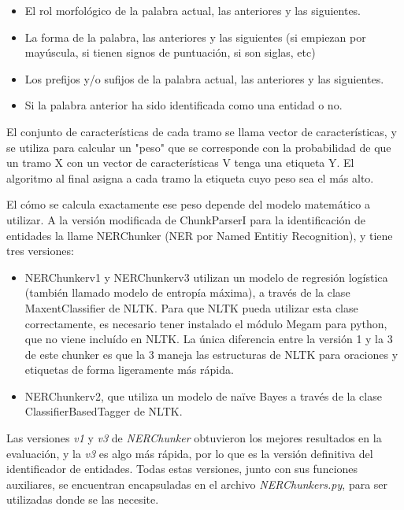 \documentclass{pre-tfg}
\begin{document}
\begin{itemize}
	\item El rol morfológico de la palabra actual, las anteriores y las siguientes.
	\item La forma de la palabra, las anteriores y las siguientes (si empiezan por mayúscula, si tienen signos de puntuación, si son siglas, etc)
	\item Los prefijos y/o sufijos de la palabra actual, las anteriores  y las siguientes.
	\item Si la palabra anterior ha sido identificada como una entidad o no.
	
\end{itemize}

El conjunto de características de cada tramo se llama vector de características, y se utiliza para calcular un "peso" que se corresponde con la probabilidad de que un tramo X con un vector de características V tenga una etiqueta Y. El algoritmo al final asigna a cada tramo la etiqueta cuyo peso sea el más alto.

El cómo se calcula exactamente ese peso depende del modelo matemático a utilizar. A la versión modificada de ChunkParserI para la identificación de entidades la llame NERChunker (NER por Named Entitiy Recognition), y tiene tres versiones:

\begin{itemize}
	\item NERChunkerv1 y NERChunkerv3 utilizan un modelo de regresión logística (también llamado modelo de entropía máxima), a través de la clase MaxentClassifier de NLTK. Para que NLTK pueda utilizar esta clase correctamente, es necesario tener instalado el módulo Megam para python, que no viene incluído en NLTK. La única diferencia entre la versión 1 y la 3 de este chunker es que la 3 maneja las estructuras de NLTK para oraciones y etiquetas de forma ligeramente más rápida.
	\item NERChunkerv2, que utiliza un modelo de naïve Bayes a través de la clase ClassifierBasedTagger de NLTK.
	
\end{itemize}

Las versiones \textit{v1} y \textit{v3} de \textit{NERChunker} obtuvieron los mejores resultados en la evaluación, y la \textit{v3} es algo más rápida, por lo que es la versión definitiva del identificador de entidades. Todas estas versiones, junto con sus funciones auxiliares, se encuentran encapsuladas en el archivo \textit{NERChunkers.py}, para ser utilizadas donde se las necesite.
\end{document}
